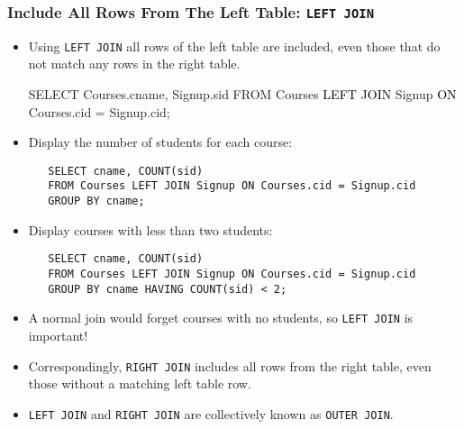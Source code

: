 \documentclass[dvipsnames]{beamer}
\begin{document}
\begin{frame}[fragile]
\frametitle{Include All Rows From The Left Table: \texttt{LEFT JOIN}}
  
\begin{itemize}
\item<+-> Using \texttt{LEFT JOIN} all rows of the left table are
  included, even those that do not match any rows in the right table.
  \begin{footnotesize}
\begin{semiverbatim}
   SELECT Courses.cname, Signup.sid
   FROM Courses \textcolor{black}{LEFT JOIN} Signup \textcolor{black}{ON} Courses.cid = Signup.cid;
\end{semiverbatim}
  \end{footnotesize}


\item<+-> Display the number of students for each course:
  \begin{footnotesize}
\begin{verbatim}
   SELECT cname, COUNT(sid)
   FROM Courses LEFT JOIN Signup ON Courses.cid = Signup.cid
   GROUP BY cname;
\end{verbatim}
  \end{footnotesize}


\item<+-> Display courses with less than two students:
  \begin{footnotesize}
\begin{verbatim}
   SELECT cname, COUNT(sid)
   FROM Courses LEFT JOIN Signup ON Courses.cid = Signup.cid
   GROUP BY cname HAVING COUNT(sid) < 2;
\end{verbatim}
  \end{footnotesize}



\item<4-> A normal join would forget courses with no students, so \texttt{LEFT
    JOIN} is important!


\item<4-> Correspondingly, \texttt{RIGHT JOIN} includes all rows from the
  right table, even those without a matching left table row.

\item<4-> \texttt{LEFT JOIN} and \texttt{RIGHT JOIN} are collectively known as
  \texttt{OUTER JOIN}.
\end{itemize}
\end{frame}
\end{document}
